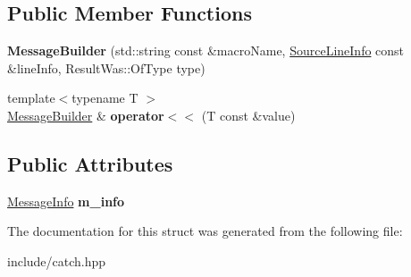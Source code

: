 \subsection*{Public Member Functions}
\begin{DoxyCompactItemize}
\item 
{\bfseries Message\+Builder} (std\+::string const \&macro\+Name, \hyperlink{structCatch_1_1SourceLineInfo}{Source\+Line\+Info} const \&line\+Info, Result\+Was\+::\+Of\+Type type)\hypertarget{structCatch_1_1MessageBuilder_ab0c6378e722680bf58852c6ee2b6e724}{}\label{structCatch_1_1MessageBuilder_ab0c6378e722680bf58852c6ee2b6e724}

\item 
{\footnotesize template$<$typename T $>$ }\\\hyperlink{structCatch_1_1MessageBuilder}{Message\+Builder} \& {\bfseries operator$<$$<$} (T const \&value)\hypertarget{structCatch_1_1MessageBuilder_a20fa48d069b20dddcc2d3df8abb123c1}{}\label{structCatch_1_1MessageBuilder_a20fa48d069b20dddcc2d3df8abb123c1}

\end{DoxyCompactItemize}
\subsection*{Public Attributes}
\begin{DoxyCompactItemize}
\item 
\hyperlink{structCatch_1_1MessageInfo}{Message\+Info} {\bfseries m\+\_\+info}\hypertarget{structCatch_1_1MessageBuilder_a979f1c2b36d78f80ee275bfa5ba0209f}{}\label{structCatch_1_1MessageBuilder_a979f1c2b36d78f80ee275bfa5ba0209f}

\end{DoxyCompactItemize}


The documentation for this struct was generated from the following file\+:\begin{DoxyCompactItemize}
\item 
include/catch.\+hpp\end{DoxyCompactItemize}
